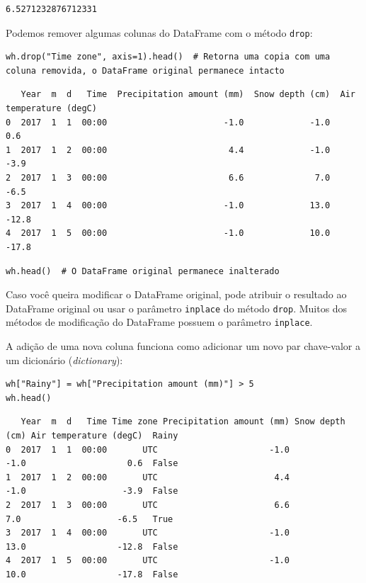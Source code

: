 \documentclass[11pt,a4paper]{article}
\begin{document}
\begin{verbatim}
6.5271232876712331
\end{verbatim}

Podemos remover algumas colunas do DataFrame com o método \texttt{drop}:

\begin{lstlisting}
wh.drop("Time zone", axis=1).head()  # Retorna uma copia com uma coluna removida, o DataFrame original permanece intacto
\end{lstlisting}

{\scriptsize
\begin{verbatim}
   Year  m  d   Time  Precipitation amount (mm)  Snow depth (cm)  Air temperature (degC)
0  2017  1  1  00:00                       -1.0             -1.0                     0.6
1  2017  1  2  00:00                        4.4             -1.0                    -3.9
2  2017  1  3  00:00                        6.6              7.0                    -6.5
3  2017  1  4  00:00                       -1.0             13.0                   -12.8
4  2017  1  5  00:00                       -1.0             10.0                   -17.8
\end{verbatim}
}

\begin{lstlisting}
wh.head()  # O DataFrame original permanece inalterado
\end{lstlisting}

Caso você queira modificar o DataFrame original, pode atribuir o resultado ao DataFrame original ou usar o parâmetro \texttt{inplace} do método \texttt{drop}. Muitos dos métodos de modificação do DataFrame possuem o parâmetro \texttt{inplace}.

A adição de uma nova coluna funciona como adicionar um novo par chave-valor a um dicionário (\textit{dictionary}):

\begin{lstlisting}
wh["Rainy"] = wh["Precipitation amount (mm)"] > 5
wh.head()
\end{lstlisting}

{\scriptsize
\begin{verbatim}
   Year  m  d   Time Time zone Precipitation amount (mm) Snow depth (cm) Air temperature (degC)  Rainy
0  2017  1  1  00:00       UTC                      -1.0            -1.0                    0.6  False
1  2017  1  2  00:00       UTC                       4.4            -1.0                   -3.9  False
2  2017  1  3  00:00       UTC                       6.6             7.0                   -6.5   True
3  2017  1  4  00:00       UTC                      -1.0            13.0                  -12.8  False
4  2017  1  5  00:00       UTC                      -1.0            10.0                  -17.8  False
\end{verbatim}
}
\end{document}
